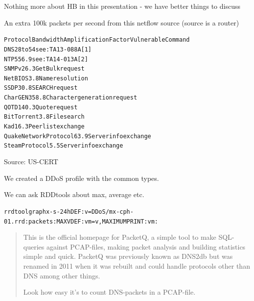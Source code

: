 \documentclass[20pt,landscape,a4paper,footrule]{foils}
\begin{document}
{\footnotesize Nothing more about HB in this presentation - we have better things to discuss}




{\small{}}





\centerline{An extra 100k packets per second from this netflow source (source is a router)}



\begin{alltt}\small
Protocol   Bandwidth Amplification Factor        Vulnerable Command
DNS        28 to 54          see: TA13-088A [1]
NTP        556.9             see: TA14-013A [2]
SNMPv2       6.3             GetBulk request
NetBIOS      3.8             Name resolution
SSDP        30.8             SEARCH request
CharGEN    358.8             Character generation request
QOTD       140.3             Quote request
BitTorrent   3.8             File search
Kad         16.3             Peer list exchange
Quake Network Protocol 63.9  Server info exchange
Steam Protocol  5.5          Server info exchange
\end{alltt}

Source: US-CERT\\




We created a DDoS profile with the common types.

We can ask RDDtools about max, average etc.
\begin{alltt}\footnotesize
rrdtool graph x -s -24h DEF:v=DDoS/mx-cph-01.rrd:packets:MAX VDEF:vm=v,MAXIMUM PRINT:vm:%
\end{alltt}




\begin{quote}
This is the official homepage for PacketQ, a simple tool to make SQL-queries against PCAP-files, making packet analysis and building statistics simple and quick. PacketQ was previously known as DNS2db but was renamed in 2011 when it was rebuilt and could handle protocols other than DNS among other things.

Look how easy it's to count DNS-packets in a PCAP-file.
\end{quote}
\end{document}
